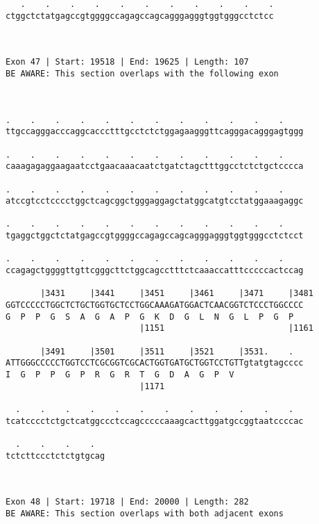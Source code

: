 \documentclass{article}
\begin{document}
\begin{Verbatim}
   .    .    .    .    .    .    .    .    .    .    .
ctggctctatgagccgtggggccagagccagcagggagggtggtgggcctctcc
                                                      
                                                      
 
Exon 47 | Start: 19518 | End: 19625 | Length: 107
BE AWARE: This section overlaps with the following exon



.    .    .    .    .    .    .    .    .    .    .    .    
ttgccagggacccaggcaccctttgcctctctggagaagggttcagggacagggagtggg
                                                            
.    .    .    .    .    .    .    .    .    .    .    .    
caaagagaggaagaatcctgaacaaacaatctgatctagctttggcctctctgctcccca
                                                            
.    .    .    .    .    .    .    .    .    .    .    .    
atccgtcctcccctggctcagcggctgggaggagctatggcatgtcctatggaaagaggc
                                                            
.    .    .    .    .    .    .    .    .    .    .    .    
tgaggctggctctatgagccgtggggccagagccagcagggagggtggtgggcctctcct
                                                            
.    .    .    .    .    .    .    .    .    .    .    .    
ccagagctggggttgttcgggcttctggcagcctttctcaaaccatttcccccactccag
                                                            
       |3431     |3441     |3451     |3461     |3471     |3481
GGTCCCCCTGGCTCTGCTGGTGCTCCTGGCAAAGATGGACTCAACGGTCTCCCTGGCCCC
G  P  P  G  S  A  G  A  P  G  K  D  G  L  N  G  L  P  G  P  
                           |1151                         |1161
  
       |3491     |3501     |3511     |3521     |3531.    .  
ATTGGGCCCCCTGGTCCTCGCGGTCGCACTGGTGATGCTGGTCCTGTTgtatgtagcccc
I  G  P  P  G  P  R  G  R  T  G  D  A  G  P  V              
                           |1171                            
  
  .    .    .    .    .    .    .    .    .    .    .    .  
tcatcccctctgctcatggccctccagcccccaaagcacttggatgccggtaatccccac
                                                            
  .    .    .    .  
tctcttccctctctgtgcag
                    
                    
 
Exon 48 | Start: 19718 | End: 20000 | Length: 282
BE AWARE: This section overlaps with both adjacent exons




\end{Verbatim}
\end{document}
